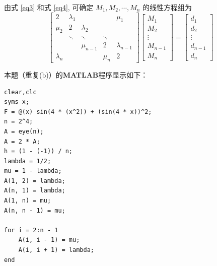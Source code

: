 \documentclass[12pt,a4paper,UTF8]{ctexart}
\theoremstyle{nonumberplain}
\begin{document}
\begin{enumerate}
\begin{enumerate}
\begin{equation}
                    \end{equation}
                    由式 \ref{eq3} 和式 \ref{eq4}, 可确定 $M_{1}, M_{2}, \cdots, M_{n}$ 的线性方程组为
                    $$
                        \left[\begin{array}{ccccc}
                                2           & \lambda_{1} &             &         & \mu_{1}       \\
                                \mu_{2}     & 2           & \lambda_{2} &         &               \\
                                            & \ddots      & \ddots      & \ddots  &               \\
                                            &             & \mu_{n-1}   & 2       & \lambda_{n-1} \\
                                \lambda_{n} &             &             & \mu_{n} & 2
                            \end{array}\right]\left[\begin{array}{c}
                                M_{1}   \\
                                M_{2}   \\
                                \vdots  \\
                                M_{n-1} \\
                                M_{n}
                            \end{array}\right]=\left[\begin{array}{c}
                                d_{1}   \\
                                d_{2}   \\
                                \vdots  \\
                                d_{n-1} \\
                                d_{n}
                            \end{array}\right]
                    $$
                    \par 本题（重复(b)）的\textbf{MATLAB}程序显示如下：
                    \begin{lstlisting}[frame=single]
clear,clc
syms x;
F = @(x) sin(4 * (x^2)) + (sin(4 * x))^2;
n = 2^4;
A = eye(n);
A = 2 * A;
h = (1 - (-1)) / n;
lambda = 1/2;
mu = 1 - lambda;
A(1, 2) = lambda;
A(n, 1) = lambda;
A(1, n) = mu;
A(n, n - 1) = mu;

for i = 2:n - 1
    A(i, i - 1) = mu;
    A(i, i + 1) = lambda;
end


\end{lstlisting}
\end{enumerate}
\end{enumerate}
\end{document}
